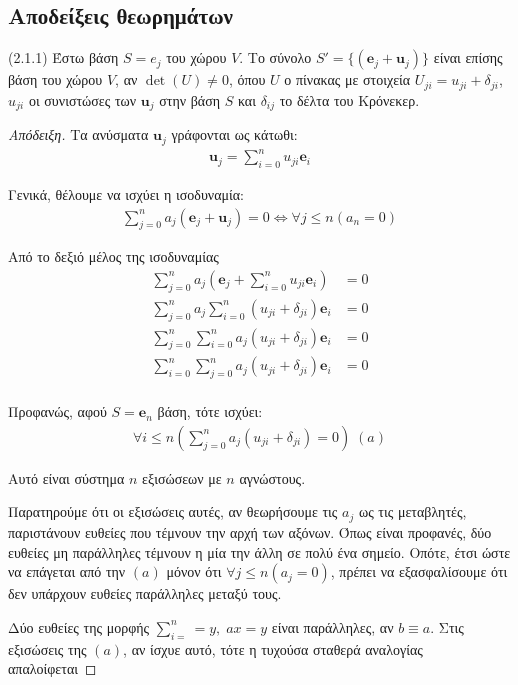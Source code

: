 \documentclass[main.tex]{subfiles}
\begin{document}
	\subsection{Αποδείξεις θεωρημάτων}
	
	\begin{unnum}
		(2.1.1) Έστω βάση ${S = {e_j}}$ του χώρου $V$. Το σύνολο ${S' = \{(\boldsymbol{e}_j + \boldsymbol{u}_j)\}}$ είναι επίσης βάση του χώρου $V$, αν ${\det{(U)}\neq 0}$, όπου $U$ ο πίνακας με στοιχεία ${U_{ji} = u_{ji} + \delta_{ji}}$, ${u_{ji}}$ οι συνιστώσες των $\boldsymbol{u}_j$ στην βάση $S$ και $\delta_{ij}$ το δέλτα του Κρόνεκερ.\\
	\end{unnum}
	\begin{proof}[Απόδειξη]
		Tα ανύσματα $\boldsymbol{u}_j$ γράφονται ως κάτωθι:
		\begin{align*}
			\boldsymbol{u}_j = \sum^n_{i=0}u_{ji}\boldsymbol{e}_i
		\end{align*}
	
		Γενικά, θέλουμε να ισχύει η ισοδυναμία:
		\begin{align*}
			\sum^n_{j=0}a_j(\boldsymbol{e}_j + \boldsymbol{u}_j) = 0 \Leftrightarrow \forall j \leq n(a_n = 0)
		\end{align*}
	
		Από το δεξιό μέλος της ισοδυναμίας
		\begin{align*}
			\sum^n_{j=0}a_j\left(\boldsymbol{e}_j + \sum^n_{i=0}u_{ji}\boldsymbol{e}_i\right) &= 0\\
			\sum^n_{j=0}a_j\sum^n_{i=0}(u_{ji} + \delta_{ji})\boldsymbol{e}_i &= 0 \\
			\sum^n_{j=0}\sum^n_{i=0}a_j(u_{ji} + \delta_{ji})\boldsymbol{e}_i &= 0 \\
			\sum^n_{i=0}\sum^n_{j=0}a_j(u_{ji} + \delta_{ji})\boldsymbol{e}_i &= 0 \\
		\end{align*}
	
		Προφανώς, αφού $S = {\boldsymbol{e}_n}$ βάση, τότε ισχύει:
		\begin{align*}
			\forall i \leq n\left(\sum^n_{j=0}a_j(u_{ji} + \delta_{ji}) = 0 \right) \; (a)
		\end{align*}
	
		Αυτό είναι σύστημα $n$ εξισώσεων με $n$ αγνώστους.
		
		Παρατηρούμε ότι οι εξισώσεις αυτές, αν θεωρήσουμε τις $a_j$ ως τις μεταβλητές, παριστάνουν ευθείες που τέμνουν την αρχή των αξόνων. Όπως είναι προφανές, δύο
		ευθείες μη παράλληλες τέμνουν η μία την άλλη σε πολύ ένα σημείο. Οπότε, έτσι ώστε να επάγεται από την $(a)$ μόνον ότι $\forall j \leq n (a_j = 0)$, πρέπει να 
		εξασφαλίσουμε ότι δεν υπάρχουν ευθείες παράλληλες μεταξύ τους.
		
		Δύο ευθείες της μορφής $\sum^n_{i=} = y,\; ax = y$ είναι παράλληλες, αν $b \equiv a$. Στις εξισώσεις της $(a)$, αν ίσχυε αυτό, τότε η τυχούσα σταθερά αναλογίας απαλοίφεται
	\end{proof}
\end{document}
